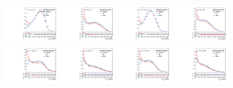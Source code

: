 \begin{figure}[htbp]
  \centering
  \includegraphics[width=0.21\textwidth]{fig/uncertainties/systs_nonRes_e_HP_bb_LDy_logWeight_ProjY.pdf}
  \includegraphics[width=0.21\textwidth]{fig/uncertainties/systs_nonRes_e_LP_bb_LDy_logWeight_ProjY.pdf}
  \includegraphics[width=0.21\textwidth]{fig/uncertainties/systs_nonRes_e_HP_bb_HDy_logWeight_ProjY.pdf}
  \includegraphics[width=0.21\textwidth]{fig/uncertainties/systs_nonRes_e_LP_bb_HDy_logWeight_ProjY.pdf}\\
  \includegraphics[width=0.21\textwidth]{fig/uncertainties/systs_nonRes_e_HP_nobb_LDy_logWeight_ProjY.pdf}
  \includegraphics[width=0.21\textwidth]{fig/uncertainties/systs_nonRes_e_LP_nobb_LDy_logWeight_ProjY.pdf}
  \includegraphics[width=0.21\textwidth]{fig/uncertainties/systs_nonRes_e_HP_nobb_HDy_logWeight_ProjY.pdf}
  \includegraphics[width=0.21\textwidth]{fig/uncertainties/systs_nonRes_e_LP_nobb_HDy_logWeight_ProjY.pdf}\\

\end{figure}
